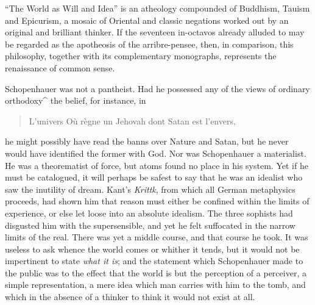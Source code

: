 \documentclass[]{book}
\begin{document}
``The World as Will and Idea'' is an atheology compounded of Buddhism,
Tauism and Epicurism, a mosaic of Oriental and classic negations worked
out by an original and brilliant thinker. If the seventeen in-octavos
already alluded to may be regarded as the apotheosis of the
arribre-pensee, then, in comparison, this philosophy, together with its
complementary monographs, represents the renaissance of common sense.

Schopenhauer was not a pantheist. Had he possessed any of the views of
ordinary orthodoxy\^{} the belief, for instance, in

\begin{quote}
L'univers Où règne un Jehovah dont Satan est l'envers,
\end{quote}

he might possibly have read the banns over Nature and Satan, but he
never would have identified the former with God. Nor was Schopenhauer a
materialist. He was a theorematist of force, but atoms found no place in
his system. Yet if he must be catalogued, it will perhaps be safest to
say that he was an idealist who saw the inutility of dream. Kant's
\emph{Krittk}, from which all German metaphysics proceeds, had shown him
that reason must either be confined within the limits of experience, or
else let loose into an absolute idealism. The three sophists had
disgusted him with the supersensible, and yet he felt suffocated in the
narrow limits of the real. There was yet a middle course, and that
course he took. It was useless to ask whence the world comes or whither
it tends, but it would not be impertinent to state \emph{what it is};
and the statement which Schopenhauer made to the public was to the
effect that the world is but the perception of a perceiver, a simple
representation, a mere idea which man carries with him to the tomb, and
which in the absence of a thinker to think it would not exist at all.
\end{document}
